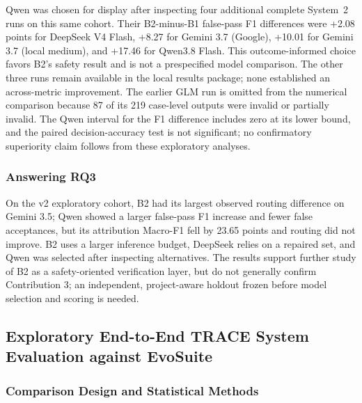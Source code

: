 \documentclass[pdflatex,sn-basic,Numbered,iicol]{sn-jnl}
\begin{document}
Qwen was chosen for display after inspecting four additional complete System~2 runs on this same cohort. Their B2-minus-B1 false-pass F1 differences were +2.08 points for DeepSeek V4 Flash, +8.27 for Gemini 3.7 (Google), +10.01 for Gemini 3.7 (local medium), and +17.46 for Qwen3.8 Flash. This outcome-informed choice favors B2's safety result and is not a prespecified model comparison. The other three runs remain available in the local results package; none established an across-metric improvement. The earlier GLM run is omitted from the numerical comparison because 87 of its 219 case-level outputs were invalid or partially invalid. The Qwen interval for the F1 difference includes zero at its lower bound, and the paired decision-accuracy test is not significant; no confirmatory superiority claim follows from these exploratory analyses.

\subsubsection{Answering RQ3}\label{subsubsec:rq3-answer}

On the v2 exploratory cohort, B2 had its largest observed routing difference on Gemini 3.5; Qwen showed a larger false-pass F1 increase and fewer false acceptances, but its attribution Macro-F1 fell by 23.65 points and routing did not improve. B2 uses a larger inference budget, DeepSeek relies on a repaired set, and Qwen was selected after inspecting alternatives. The results support further study of B2 as a safety-oriented verification layer, but do not generally confirm Contribution 3; an independent, project-aware holdout frozen before model selection and scoring is needed.

\subsection{Exploratory End-to-End TRACE System Evaluation against EvoSuite}\label{subsec:trace-evosuite}

\subsubsection{Comparison Design and Statistical Methods}\label{subsubsec:trace-design}
\end{document}
